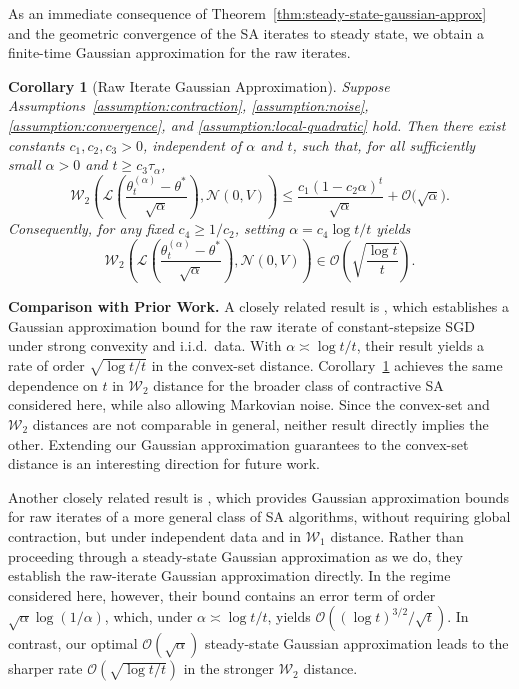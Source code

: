 \documentclass[11pt,letterpaper]{article}
\theoremstyle{plain}
\newtheorem{corollary}{Corollary}
\theoremstyle{definition}
\theoremstyle{remark}
\newcommand{\W}{\mathcal{W}}
\newcommand{\law}{\mathcal{L}}
\begin{document}
As an immediate consequence of
Theorem~\ref{thm:steady-state-gaussian-approx} and the geometric convergence
of the SA iterates to steady state, we obtain a finite-time Gaussian
approximation for the raw iterates.
\begin{corollary}[Raw Iterate Gaussian Approximation]
\label{cor:raw-Gaussian}
Suppose Assumptions~\ref{assumption:contraction},
\ref{assumption:noise}, \ref{assumption:convergence}, and
\ref{assumption:local-quadratic} hold. Then there exist constants
$c_1,c_2,c_3>0$, independent of $\alpha$ and $t$, such that, for all
sufficiently small $\alpha>0$ and $t\geq c_3\tau_\alpha$,
\[
    \W_2\left(
        \law\left(
            \frac{\theta_t^{(\alpha)}-\theta^*}{\sqrt{\alpha}}
        \right),
        \mathcal N(0,V)
    \right)
    \leq
    \frac{c_1(1-c_2\alpha)^t}{\sqrt{\alpha}}
    +
    \mathcal O\bigl(\sqrt{\alpha}\bigr).
\]
Consequently, for any fixed \(c_4\geq 1/c_2\), setting $\alpha = c_4\log t/t$ yields
\[
    \W_2\left(
        \law\left(
            \frac{\theta_t^{(\alpha)}-\theta^*}{\sqrt{\alpha}}
        \right),
        \mathcal N(0,V)
    \right)
    \in 
    \mathcal O\left(
        \sqrt{\frac{\log t}{t}}
    \right).
\]
\end{corollary}
\noindent\textbf{Comparison with Prior Work.} A closely related result is \cite{wei2026gaussian}, which establishes a
Gaussian approximation bound for the raw iterate of constant-stepsize SGD
under strong convexity and i.i.d.\ data. With
\(\alpha\asymp \log t/t\), their result yields a rate of order
\(\sqrt{\log t/t}\) in the convex-set distance. Corollary~\ref{cor:raw-Gaussian}
achieves the same dependence on \(t\) in $\W_2$ distance for the
broader class of contractive SA considered here, while also allowing
Markovian noise. Since the convex-set and $\W_2$ distances are not
comparable in general, neither result directly implies the other. Extending
our Gaussian approximation guarantees to the convex-set distance is an
interesting direction for future work.

Another closely related result is \cite{haque2026accurately}, which provides
 Gaussian approximation bounds for raw iterates of a more general
class of SA algorithms, without requiring global contraction, but under
independent data and in $\W_1$ distance. Rather than proceeding
through a steady-state Gaussian approximation as we do, they establish the raw-iterate
Gaussian approximation directly. In the regime considered here, however,
their bound contains an error term of order
\(\sqrt{\alpha}\log(1/\alpha)\), which, under
\(\alpha\asymp \log t/t\), yields $\mathcal O\left((\log t)^{3/2}/\sqrt t\right)$. In contrast, our optimal \(\mathcal O(\sqrt{\alpha})\) steady-state Gaussian approximation
leads to the sharper rate $\mathcal O(\sqrt{\log t/t})$ in the stronger $\W_2$ distance. 
\end{document}
